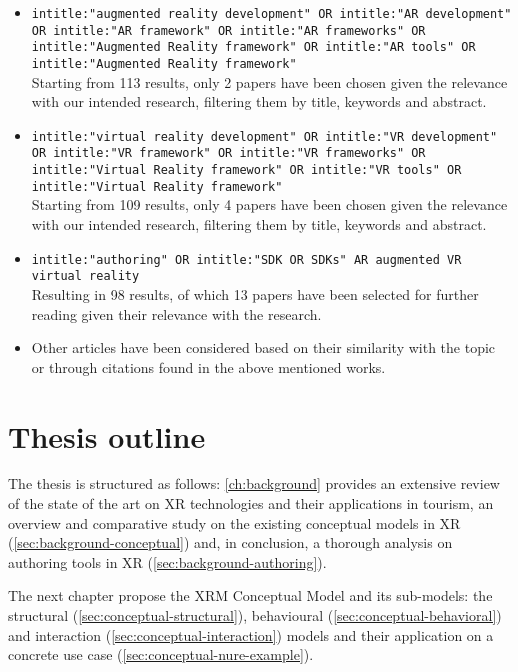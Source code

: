 \begin{enumerate}
        \begin{itemize}
            \item \texttt{intitle:"augmented reality development" OR intitle:"AR development" OR intitle:"AR framework" OR intitle:"AR frameworks" OR intitle:"Augmented Reality framework" OR intitle:"AR tools" OR intitle:"Augmented Reality framework"}\\
            Starting from 113 results, only 2 papers have been chosen given the relevance with our intended research, filtering them by title, keywords and abstract.
            \item \texttt{intitle:"virtual reality development" OR intitle:"VR development" OR intitle:"VR framework" OR intitle:"VR frameworks" OR intitle:"Virtual Reality framework" OR intitle:"VR tools" OR intitle:"Virtual Reality framework"}\\
            Starting from 109 results, only 4 papers have been chosen given the relevance with our intended research, filtering them by title, keywords and abstract.
            \item \texttt{intitle:"authoring" OR intitle:"SDK OR SDKs" AR augmented VR virtual reality}\\
            Resulting in 98 results, of which 13 papers have been selected for further reading given their relevance with the research.
            \item Other articles have been considered based on their similarity with the topic or through citations found in the above mentioned works.
        \end{itemize}
\end{enumerate}

\section{Thesis outline}
The thesis is structured as follows: \autoref{ch:background} provides an extensive review of the state of the art on XR technologies and their applications in tourism, an overview and comparative study on the existing conceptual models in XR (\autoref{sec:background-conceptual}) and, in conclusion, a thorough analysis on authoring tools in XR (\autoref{sec:background-authoring}).

The next chapter propose the XRM Conceptual Model and its sub-models: the structural (\autoref{sec:conceptual-structural}), behavioural (\autoref{sec:conceptual-behavioral}) and interaction (\autoref{sec:conceptual-interaction}) models and their application on a concrete use case (\autoref{sec:conceptual-nure-example}). 

